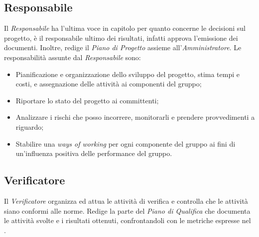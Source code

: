 	\subsection{Responsabile}
	
	Il \textit{Responsabile} ha l'ultima voce in capitolo per quanto concerne le decisioni sul progetto, è il responsabile ultimo dei risultati, infatti approva l'emissione dei documenti. Inoltre, redige il \textit{Piano di Progetto} assieme all'\textit{Amministratore}. 
	Le responsabilità assunte dal \textit{Responsabile} sono:

	\begin{itemize}

		\item Pianificazione e organizzazione dello sviluppo del progetto, stima tempi e costi, e assegnazione delle attività ai componenti del gruppo;
		\item Riportare lo stato del progetto ai committenti;
		\item Analizzare i rischi che posso incorrere, monitorarli e prendere provvedimenti a riguardo;
		\item Stabilire una \textit{ways of working} per ogni componente del gruppo ai fini di un'influenza positiva delle performance del gruppo.
	
	\end{itemize}

	
	\subsection{Verificatore}

	Il \textit{Verificatore} organizza ed attua le attività di verifica e controlla che le attività siano conformi alle norme. Redige la parte del \textit{Piano di Qualifica} che documenta le attività svolte e i risultati ottenuti, confrontandoli con le metriche espresse nel \PianoDiQualifica. 